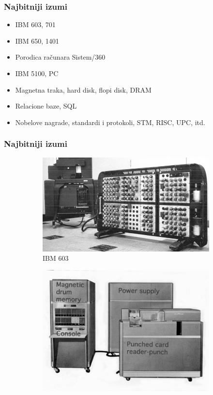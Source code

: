 \documentclass{beamer}
\begin{document}
\begin{frame}[fragile]\frametitle{Najbitniji izumi}
	\begin{itemize}	
		\item IBM 603, 701
		\item IBM 650, 1401	
		\item Porodica računara Sistem/360
		\item IBM 5100, PC
		\item Magnetna traka, hard disk, flopi disk, DRAM
		\item Relacione baze, SQL
		\item Nobelove nagrade, standardi i protokoli, STM, RISC, UPC, itd.
		\end{itemize}
\end{frame}
\begin{frame}[fragile]\frametitle{Najbitniji izumi}
	\begin{figure}[htb]\captionsetup[subfigure]{labelformat=empty}
    \centering 
\begin{subfigure}{0.25\textwidth}
  \includegraphics[width=\linewidth]{ibm603.jpg}
  \caption{IBM 603}
  \label{fig:1}
\end{subfigure}\hfil
\begin{subfigure}{0.25\textwidth}
  \includegraphics[width=\linewidth]{ibm650.png}

\end{subfigure}
\end{figure}
\end{frame}
\end{document}

